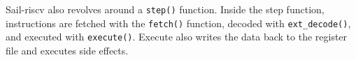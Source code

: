 Sail-riscv also revolves around a \lstinline{step()} function. Inside the step function, instructions are fetched with the \lstinline{fetch()} function, decoded with \lstinline{ext_decode()}, and executed with \lstinline{execute()}. Execute also writes the data back to the register file and executes side effects. \cite{RISCVSailModel2023}




